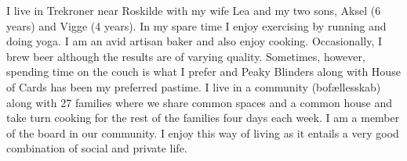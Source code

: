 



%
% 


% 

\begin{cventries}

\cventry
{} %
{} %
{}%
{} %
{ %
I live in Trekroner near Roskilde with my wife Lea and my two sons, Aksel (6 years) and Vigge (4 years). In my spare time I enjoy exercising by running and doing yoga. I am an avid artisan baker and also enjoy cooking. Occasionally, I brew beer although the results are of varying quality. Sometimes, however, spending time on the couch is what I prefer and Peaky Blinders along with House of Cards has been my preferred pastime. I live in a community (bofællesskab) along with 27 families where we share common spaces and a common house and take turn cooking for the rest of the families four days each week. I am a member of the board in our community. I enjoy this way of living as it entails a very good combination of social and private life.
}






\end{cventries}
